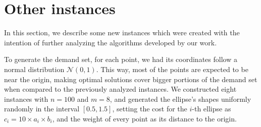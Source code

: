 \begin{table}
	\begin{center}
		\caption{Solutions of MCER-$k$ for instances AB061-AB120.}
		\label{tab:mcer-results-ab2}
	\end{center}
\end{table}

\section{Other instances}

In this section, we describe some new instances which were created with the intention of further analyzing the algorithms developed by our work.

To generate the demand set, for each point, we had its coordinates follow a normal distribution $\mathcal{N}(0, 1)$. This way, most of the points are expected to be near the origin, making optimal solutions cover bigger portions of the demand set when compared to the previously analyzed instances.
We constructed eight instances with $n=100$ and $m=8$, and generated the ellipse's shapes uniformly randomly in the interval $[0.5, 1.5]$, setting the cost for the $i$-th ellipse as $c_i=10 \times a_i\times b_i$, and the weight of every point as its distance to the origin.

